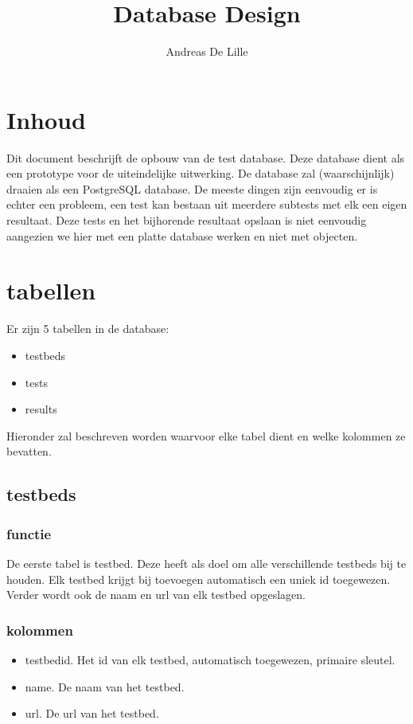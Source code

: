 \documentclass[11pt]{article}
\begin{document}
\title{Database Design}
\author{Andreas De Lille}
\maketitle

\section{Inhoud}
Dit document beschrijft de opbouw van de test database.
Deze database dient als een prototype voor de uiteindelijke uitwerking.
De database zal (waarschijnlijk) draaien als een PostgreSQL database.
De meeste dingen zijn eenvoudig er is echter een probleem, een test kan bestaan uit meerdere subtests met elk een eigen resultaat. Deze tests en het bijhorende resultaat opslaan is niet eenvoudig aangezien we hier met een platte database werken en niet met objecten.

\section{tabellen}
Er zijn 5 tabellen in de database:
\begin{itemize}
\item testbeds
\item tests
\item results
\end{itemize}
Hieronder zal beschreven worden waarvoor elke tabel dient en welke kolommen ze bevatten.

\subsection{testbeds}
\subsubsection{functie}
De eerste tabel is testbed. Deze heeft als doel om alle verschillende testbeds bij te houden. Elk testbed krijgt bij toevoegen automatisch een uniek id toegewezen. Verder wordt ook de naam en url van elk testbed opgeslagen.
\subsubsection{kolommen}
\begin{itemize}
\item testbedid. Het id van elk testbed, automatisch toegewezen, primaire sleutel.
\item name. De naam van het testbed.
\item url. De url van het testbed.
\end{itemize}
\end{document}
